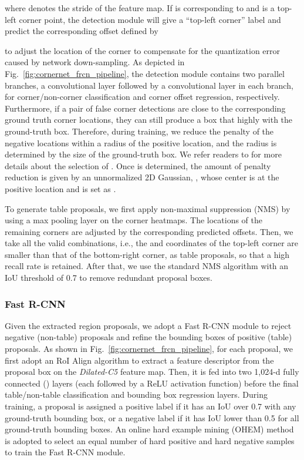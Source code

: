 \documentclass[final,3p,times,twocolumn]{elsarticle}
\begin{document}
where  denotes the stride of the feature map. If  is corresponding to  and  is a top-left corner point, the detection module will give  a “top-left corner” label and predict the corresponding offset  defined by

to adjust the location of the corner to compensate for the quantization error caused by network down-sampling. As depicted in Fig.~\ref{fig:cornernet_frcn_pipeline}, the detection module contains two parallel branches, a  convolutional layer followed by a  convolutional layer in each branch, for corner/non-corner classification and corner offset regression, respectively. Furthermore, if a pair of false corner detections are close to the corresponding ground truth corner locations, they can still produce a box that highly {\color{black}{overlaps}} with the ground-truth box. Therefore, during training, we reduce the penalty of the negative locations within a radius  of the positive location, and the radius  is determined by the size of the ground-truth box. We refer readers to \cite{law2018cornernet} for more details about the selection of . Once  is determined, the amount of penalty reduction is given by an unnormalized 2D Gaussian, , whose center is at the positive location and  is set as . 

To generate table proposals, we first apply non-maximal suppression (NMS) by using a  max pooling layer on the corner heatmaps. {\color{black}{Then top- top-left and bottom-right corners are extracted from the heatmaps, which are further filtered by a score threshold, .}}
The locations of the remaining corners are adjusted by the corresponding predicted offsets. 
Then, we take all the valid combinations, i.e., the  and  coordinates of the top-left corner are smaller than that of the bottom-right corner, as table proposals, so that a high recall rate is retained. After that, we use the standard NMS algorithm with an IoU threshold of 0.7 to remove redundant proposal boxes.

\subsubsection{Fast R-CNN}
\label{subsubsec:FRCN}
Given the extracted region proposals, we adopt a Fast R-CNN module to reject negative (non-table) proposals and refine the bounding boxes of positive (table) proposals. As shown in Fig.~\ref{fig:cornernet_frcn_pipeline}, for each proposal, we first adopt an RoI Align algorithm \cite{he2017mask} to extract a  feature descriptor from the proposal box on the \textit{Dilated-C5} feature map. Then, it is fed into two 1,024-d fully connected () layers (each followed by a ReLU activation function) before the final table/non-table classification and bounding box regression layers. During training, a proposal is assigned a positive label if it has an IoU over 0.7 with any ground-truth bounding box, or a negative label if it has IoU lower than 0.5 for all ground-truth bounding boxes. An online hard example mining (OHEM) method is adopted to select an equal number of hard positive and hard negative samples to train the Fast R-CNN module.
\end{document}
